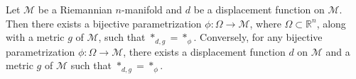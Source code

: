 

\begin{theorem}\label{equiv_conv}
    Let $\mathcal{M}$ be a Riemannian $n$-manifold and $d$ be a displacement function on $\mathcal{M}$. Then there exists a bijective parametrization $\phi: \Omega \to \mathcal{M}$, where $\Omega \subset \mathbb{R}^n$, along with a metric $g$ of $\mathcal{M}$, such that $*_{d, g} = *_\phi$. Conversely, for any bijective parametrization $\phi: \Omega \to \mathcal{M}$, there exists a displacement function $d$ on $\mathcal{M}$ and a metric $g$ of $\mathcal{M}$ such that $*_{d, g} = *_\phi$.
\end{theorem}

